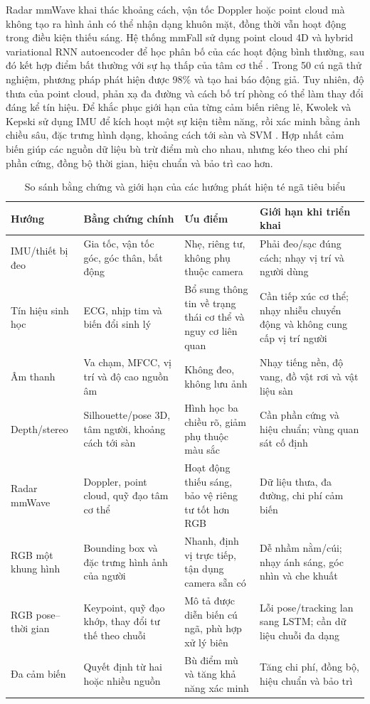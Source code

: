 Radar mmWave khai thác khoảng cách, vận tốc Doppler hoặc point cloud mà không tạo ra hình ảnh có thể nhận dạng khuôn mặt, đồng thời vẫn hoạt động trong điều kiện thiếu sáng. Hệ thống mmFall sử dụng point cloud 4D và hybrid variational RNN autoencoder để học phân bố của các hoạt động bình thường, sau đó kết hợp điểm bất thường với sự hạ thấp của tâm cơ thể . Trong 50 cú ngã thử nghiệm, phương pháp phát hiện được 98\% và tạo hai báo động giả. Tuy nhiên, độ thưa của point cloud, phản xạ đa đường và cách bố trí phòng có thể làm thay đổi đáng kể tín hiệu. Để khắc phục giới hạn của từng cảm biến riêng lẻ, Kwolek và Kepski sử dụng IMU để kích hoạt một sự kiện tiềm năng, rồi xác minh bằng ảnh chiều sâu, đặc trưng hình dạng, khoảng cách tới sàn và SVM . Hợp nhất cảm biến giúp các nguồn dữ liệu bù trừ điểm mù cho nhau, nhưng kéo theo chi phí phần cứng, đồng bộ thời gian, hiệu chuẩn và bảo trì cao hơn.

\begin{table}[H]
\centering
\caption{So sánh bằng chứng và giới hạn của các hướng phát hiện té ngã tiêu biểu}
\label{tab:fall_sensing_comparison}
\small
\begin{tabularx}{\textwidth}{|p{2.6cm}|X|X|X|}
\hline
\textbf{Hướng} & \textbf{Bằng chứng chính} & \textbf{Ưu điểm} & \textbf{Giới hạn khi triển khai} \\
\hline
IMU/thiết bị đeo & Gia tốc, vận tốc góc, góc thân, bất động & Nhẹ, riêng tư, không phụ thuộc camera & Phải đeo/sạc đúng cách; nhạy vị trí và người dùng \\
\hline
Tín hiệu sinh học & ECG, nhịp tim và biến đổi sinh lý & Bổ sung thông tin về trạng thái cơ thể và nguy cơ liên quan & Cần tiếp xúc cơ thể; nhạy nhiễu chuyển động và không cung cấp vị trí người \\
\hline
Âm thanh & Va chạm, MFCC, vị trí và độ cao nguồn âm & Không đeo, không lưu ảnh & Nhạy tiếng nền, độ vang, đồ vật rơi và vật liệu sàn \\
\hline
Depth/stereo & Silhouette/pose 3D, tâm người, khoảng cách tới sàn & Hình học ba chiều rõ, giảm phụ thuộc màu sắc & Cần phần cứng và hiệu chuẩn; vùng quan sát cố định \\
\hline
Radar mmWave & Doppler, point cloud, quỹ đạo tâm cơ thể & Hoạt động thiếu sáng, bảo vệ riêng tư tốt hơn RGB & Dữ liệu thưa, đa đường, chi phí cảm biến \\
\hline
RGB một khung hình & Bounding box và đặc trưng hình ảnh của người & Nhanh, định vị trực tiếp, tận dụng camera sẵn có & Dễ nhầm nằm/cúi; nhạy ánh sáng, góc nhìn và che khuất \\
\hline
RGB pose--thời gian & Keypoint, quỹ đạo khớp, thay đổi tư thế theo chuỗi & Mô tả được diễn biến cú ngã, phù hợp xử lý biên & Lỗi pose/tracking lan sang LSTM; cần dữ liệu chuỗi đa dạng \\
\hline
Đa cảm biến & Quyết định từ hai hoặc nhiều nguồn & Bù điểm mù và tăng khả năng xác minh & Tăng chi phí, đồng bộ, hiệu chuẩn và bảo trì \\
\hline
\end{tabularx}
\end{table}

